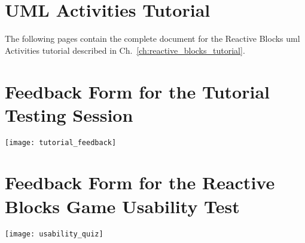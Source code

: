 \begin{appendices}

\chapter{UML Activities Tutorial}
\label{appx:tutorial}
The following pages contain the complete document for the Reactive Blocks \gls{uml} Activities tutorial described in Ch.~\ref{ch:reactive_blocks_tutorial}.


\chapter{Feedback Form for the Tutorial Testing Session}
\label{appx:feedback_form}

\texttt{[image: tutorial\_feedback]}


\chapter{Feedback Form for the Reactive Blocks Game Usability Test}
\label{appx:game_feedback_form}

\texttt{[image: usability\_quiz]}







\end{appendices}
